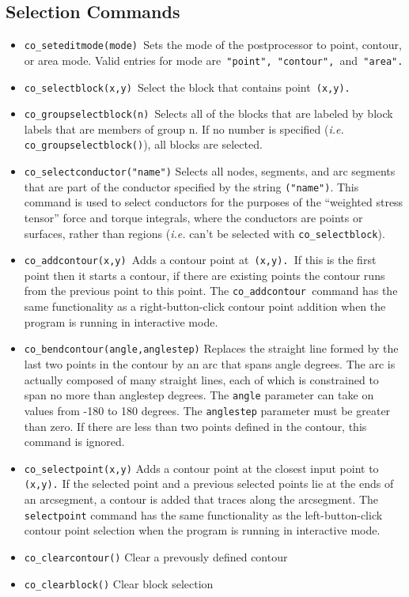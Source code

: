 \subsection{Selection Commands}

\begin{itemize}
\item \texttt{co\_seteditmode(mode) }Sets the mode of the postprocessor to point,
contour, or area mode. Valid entries for mode are\texttt{ "point",
"contour", }and\texttt{ "area". }

\item \texttt{co\_selectblock(x,y) }Select the block that contains point\texttt{
(x,y).}

\item \texttt{co\_groupselectblock(n) }Selects all of the blocks that are labeled by
block labels that are members of group n. If no number is specified
({\em i.e.} \texttt{co\_groupselectblock()}), all blocks are selected.

\item \texttt{co\_selectconductor("name")} Selects all nodes, segments, and arc
segments that are part of the conductor specified by the string
\texttt{("name")}. This command is used to select conductors for the
purposes of the ``weighted stress tensor'' force and torque
integrals, where the conductors are points or surfaces, rather than
regions ({\em i.e.} can't be selected with \texttt{co\_selectblock}).

\item \texttt{co\_addcontour(x,y) }Adds a contour point at\texttt{ (x,y). }If this is
the first point then it starts a contour, if there are existing
points the contour runs from the previous point to this point. The
\texttt{co\_addcontour }command has the same functionality as a
right-button-click contour point addition when the program is
running in interactive mode.\texttt{ }

\item \texttt{co\_bendcontour(angle,anglestep)} Replaces the straight line formed by
the last two points in the contour by an arc that spans angle
degrees. The arc is actually composed of many straight lines, each
of which is constrained to span no more than anglestep degrees. The
\texttt{angle} parameter can take on values from -180 to 180
degrees. The \texttt{anglestep} parameter must be greater than
zero. If there are less than two points defined in the contour,
this command is ignored.

\item \texttt{co\_selectpoint(x,y)} Adds a contour point at the closest input point to
\texttt{(x,y).} If the selected point and a previous selected points lie at
the ends of an arcsegment, a contour is added that traces along the
arcsegment. The \texttt{selectpoint} command has the same
functionality as the left-button-click contour point selection when
the program is running in interactive mode.

\item \texttt{co\_clearcontour()} Clear a prevously defined contour

\item \texttt{co\_clearblock()} Clear block selection
\end{itemize}
